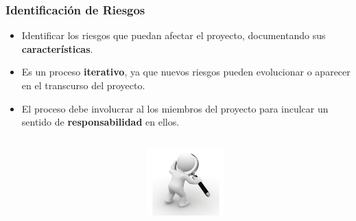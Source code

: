 
\begin{frame}
\frametitle{Identificación de Riesgos}

\begin{itemize}
    \item Identificar los riesgos que puedan afectar el proyecto, documentando
    sus \textbf{características}.
    \item Es un proceso \textbf{iterativo}, ya que nuevos riesgos pueden evolucionar o aparecer en el transcurso del proyecto.
    \item El proceso debe involucrar al los miembros del proyecto para
    inculcar un sentido de \textbf{responsabilidad} en ellos.
\end{itemize}
\begin{columns}
	\begin{column}{0.6\textwidth}
	\end{column}
	\begin{column}{0.4\textwidth}
		\includegraphics[width=3cm]{img/random_img_2}
	\end{column}
\end{columns}
\end{frame}

